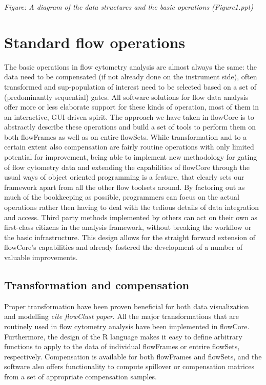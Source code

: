 \documentclass[12pt]{article}
\begin{document}
\textit{Figure: A diagram of the data structures and the basic
  operations (Figure1.ppt)}



\section{Standard flow operations}
The basic operations in flow cytometry analysis are almost always the
same: the data need to be compensated (if not already done on the
instrument side), often transformed and sup-population of interest
need to be selected based on a set of (predominantly sequential)
gates. All software solutions for flow data analysis offer more or
less elaborate support for these kinds of operation, most of them in
an interactive, GUI-driven spirit. The approach we have taken in
flowCore is to abstractly describe these operations and build a set of
tools to perform them on both flowFrames as well as on entire
flowSets. While transformation and to a certain extent also
compensation are fairly routine operations with only limited potential
for improvement, being able to implement new methodology for gating of
flow cytometry data and extending the capabilities of flowCore through
the usual ways of object oriented programming is a feature, that
clearly sets our framework apart from all the other flow toolsets
around. By factoring out as much of the bookkeeping as possible,
programmers can focus on the actual operations rather then having to
deal with the tedious details of data integration and access. Third
party methods implemented by others can act on their own as
first-class citizens in the analysis framework, without breaking the
workflow or the basic infrastructure. This design allows for the
straight forward extension of flowCore's capabilities and already
fostered the development of a number of valuable
improvements. \citep{(flowClust, plateCore)}




\subsection*{Transformation and compensation}
Proper transformation have been proven beneficial for both data
visualization and modelling \textit{cite flowClust paper}. All the
major transformations that are routinely used in flow cytometry
analysis have been implemented in flowCore. Furthermore, the design of
the R language makes it easy to define arbitrary functions to apply to
the data of individual flowFrames or entrire flowSets,
respectively. Compensation is available for both flowFrames and
flowSets, and the software also offers functionality to compute
spillover or compensation matrices from a set of appropriate
compensation samples. 
\end{document}
